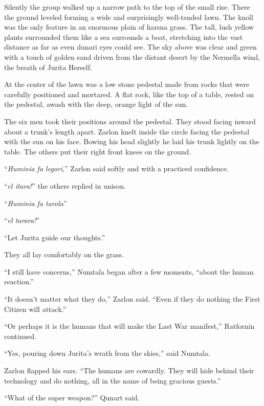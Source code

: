 Silently the group walked up a narrow path to the top of the small rise. There the ground
leveled forming a wide and surprisingly well-tended lawn. The knoll was the only feature in an
enormous plain of harsna grass. The tall, lush yellow plants surrounded them like a sea
surrounds a boat, stretching into the vast distance as far as even dunari eyes could see. The
sky above was clear and green with a touch of golden sand driven from the distant desert by the
Nermella wind, the breath of Jurita Herself.

At the center of the lawn was a low stone pedestal made from rocks that were carefully
positioned and mortared. A flat rock, like the top of a table, rested on the pedestal, awash
with the deep, orange light of the sun.

The six men took their positions around the pedestal. They stood facing inward about a trunk's
length apart. Zarlon knelt inside the circle facing the pedestal with the sun on his face.
Bowing his head slightly he laid his trunk lightly on the table. The others put their right
front knees on the ground.

``\textit{Huminia fa legori},'' Zarlon said softly and with a practiced confidence.

``\textit{el itara!}'' the others replied in unison.

``\textit{Huminia fa tarola}''

``\textit{el tarara!}''

``Let Jurita guide our thoughts.''

They all lay comfortably on the grass.

``I still have concerns,'' Numtala began after a few moments, ``about the human reaction.''

``It doesn't matter what they do,'' Zarlon said. ``Even if they do nothing the First Citizen
will attack.''

``Or perhaps it is the humans that will make the Last War manifest,'' Ratfornin continued.

``Yes, pouring down Jurita's wrath from the skies,'' said Numtala.

Zarlon flapped his ears. ``The humans are cowardly. They will hide behind their technology and
do nothing, all in the name of being gracious guests.''

``What of the super weapon?'' Qunart said.


